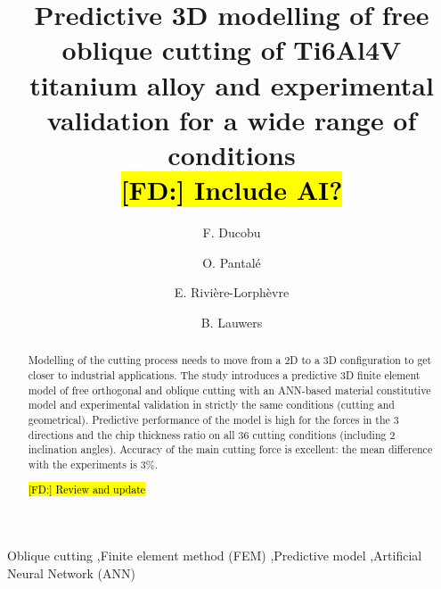 \documentclass[preprint,12pt,times]{elsarticle}
\DeclareRobustCommand{\FD}[1]{ {\begingroup\sethlcolor{VWgreen}\textcolor{black}{\hl{[FD:] #1}}\endgroup} }
\begin{document}
\begin{frontmatter}

\title{Predictive 3D modelling of free oblique cutting of Ti6Al4V titanium alloy and experimental validation for a wide range of conditions\\ \FD{Include AI?}}

\author[1]{F. Ducobu}

\author[2]{O. Pantal\'{e}}
\author[1]{E. Rivi\`{e}re-Lorph\`{e}vre}
\author[3]{B. Lauwers}

\address[1]{Machine Design and Production Engineering Lab, Research Institute for Science and Material Engineering, UMONS, Belgium}
\address[2]{Laboratoire G\'{e}nie de Production, INP/ENIT, Universit\'{e} de Toulouse, Tarbes, France}
\address[3]{Department of Mechanical Engineering, KU Leuven \& Flanders Make@KU Leuven-MaPS, Belgium}

\begin{abstract}

Modelling of the cutting process needs to move from a 2D to a 3D configuration to get closer to industrial applications. The study introduces a predictive 3D finite element model of free orthogonal and oblique cutting with an ANN-based material constitutive model and experimental validation in strictly the same conditions (cutting and geometrical). Predictive performance of the model is high for the forces in the 3 directions and the chip thickness ratio on all 36 cutting conditions (including 2 inclination angles). Accuracy of the main cutting force is excellent: the mean difference with the experiments is 3\%.

\FD{Review and update}

\end{abstract}

\begin{keyword}

Oblique cutting \sep Finite element method (FEM) \sep Predictive model \sep Artificial Neural Network (ANN)

\end{keyword}

\end{frontmatter}

\linenumbers
\end{document}
